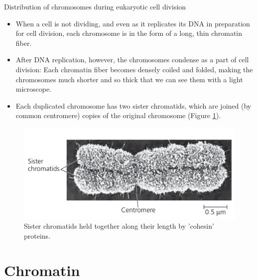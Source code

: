 \documentclass[11pt,dvipsnames,ignorenonframetext,aspectratio=169]{beamer}
\providecommand{\tightlist}{%
  \setlength{\itemsep}{0pt}\setlength{\parskip}{0pt}}
\begin{document}
\begin{frame}{Distribution of chromosomes during eukaryotic cell
division}
\protect\hypertarget{distribution-of-chromosomes-during-eukaryotic-cell-division}{}
\begin{itemize}
\tightlist
\item
  When a cell is not dividing, and even as it replicates its DNA in
  preparation for cell division, each chromosome is in the form of a
  long, thin chromatin fiber.
\item
  After DNA replication, however, the chromosomes condense as a part of
  cell division: Each chromatin fiber becomes densely coiled and folded,
  making the chromosomes much shorter and so thick that we can see them
  with a light microscope.
\item
  Each duplicated chromosome has two sister chromatids, which are joined
  (by common centromere) copies of the original chromosome (Figure
  \ref{fig:duplicated-chromosome}).
\end{itemize}
\end{frame}

\begin{frame}{}
\protect\hypertarget{section-4}{}
\begin{figure}

{\centering \includegraphics[width=0.8\linewidth]{../images/duplicated_chromosomes_hd} 

}

\caption{Sister chromatids held together along their length by 'cohesin' proteins.}\label{fig:duplicated-chromosome}
\end{figure}
\end{frame}

\hypertarget{chromatin}{%
\section{Chromatin}\label{chromatin}}
\end{document}
